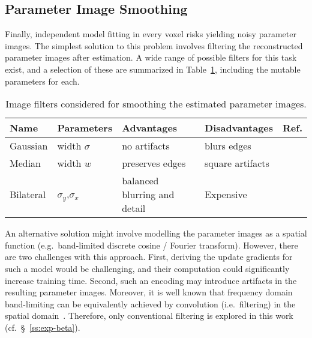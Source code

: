 \subsection{Parameter Image Smoothing}\label{ss:vlr-reg-smooth}
Finally, independent model fitting in every voxel risks yielding noisy parameter images.
The simplest solution to this problem involves
filtering the reconstructed parameter images after estimation.
A wide range of possible filters for this task exist,
and a selection of these are summarized in Table~\ref{tab:filters},
including the mutable parameters for each.
\begin{table}
  \centering
  \caption{Image filters considered for smoothing the estimated parameter images.}%
  \label{tab:filters}
  \begin{tabular}{llllc}
  	\toprule
  	Name      & Parameters            & Advantages                   & Disadvantages    &        Ref.         \\ \midrule
  	Gaussian  & width $\sigma$        & no artifacts                 & blurs edges      & \cite{Gonzalez2006} \\ %
  	Median    & width $w$             & preserves edges              & square artifacts & \cite{Gonzalez2006} \\ %
  	Bilateral & $\sigma_y$,$\sigma_x$ & balanced blurring and detail & Expensive        &  \cite{Tomasi1998}  \\ \bottomrule %
  \end{tabular}
\end{table}
\par
An alternative solution might involve modelling the parameter images as a spatial function
(e.g.\ band-limited discrete cosine / Fourier transform).
However, there are two challenges with this approach.
First, deriving the update gradients for such a model would be challenging,
and their computation could significantly increase training time.
Second, such an encoding may introduce artifacts in the resulting parameter images.
Moreover, it is well known that frequency domain band-limiting
can be equivalently achieved by convolution (i.e.\ filtering)
in the spatial domain~\cite{Gonzalez2006}.
Therefore, only conventional filtering is explored in this work (cf.~\S~\ref{ss:exp-beta}).
